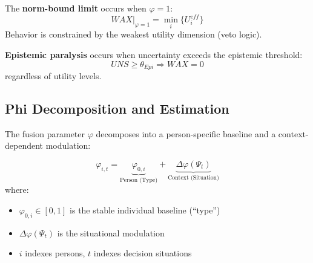 \begin{definition}
\label{def:norm-bound}
The \textbf{norm-bound limit} occurs when $\varphi = 1$:
\begin{equation}
WAX|_{\varphi=1} = \min_i \{U_i^{eff}\}
\end{equation}
Behavior is constrained by the weakest utility dimension (veto logic).
\end{definition}

\begin{definition}
\label{def:epistemic-paralysis}
\textbf{Epistemic paralysis} occurs when uncertainty exceeds the epistemic threshold:
\begin{equation}
UNS \geq \theta_{Epi} \Rightarrow WAX = 0
\end{equation}
regardless of utility levels.
\end{definition}



\subsection{Phi Decomposition and Estimation}
\label{sec:phi-estimation}

The fusion parameter $\varphi$ decomposes into a person-specific baseline and a context-dependent modulation:

\begin{definition}
\label{def:phi-decomposition}
\begin{equation}
\varphi_{i,t} = \underbrace{\varphi_{0,i}}_{\text{Person (Type)}} + \underbrace{\Delta\varphi(\Psi_t)}_{\text{Context (Situation)}}
\end{equation}
where:
\begin{itemize}
\item $\varphi_{0,i} \in [0,1]$ is the stable individual baseline (``type'')
\item $\Delta\varphi(\Psi_t)$ is the situational modulation
\item $i$ indexes persons, $t$ indexes decision situations
\end{itemize}
\end{definition}

